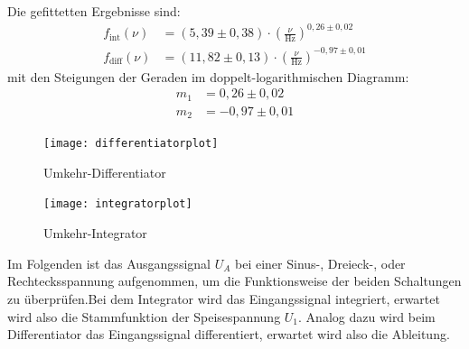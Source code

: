 \documentclass{scrartcl}
\begin{document}
\newpage
\noindent
Die gefittetten Ergebnisse sind:
 \begin{align}
     f_{\text{int}}(\nu)&=(5,39\pm0,38)\cdot \left(\frac{\nu}{\text{Hz}}\right)^{0,26\pm0,02}\\
     f_{\text{diff}}(\nu)&=(11,82\pm0,13)\cdot \left(\frac{\nu}{\text{Hz}}\right)^{-0,97\pm0,01}
 \end{align}
 mit den Steigungen der Geraden im doppelt-logarithmischen Diagramm:
 \begin{align}
   m_1&=0,26\pm0,02\\
   m_2&=-0,97\pm0,01
 \end{align}
\begin{figure}[!h]
\centering
\texttt{[image: differentiatorplot]}
\caption{Umkehr-Differentiator}
\label{dif}
\end{figure}
\begin{figure}[!h]
\centering
\texttt{[image: integratorplot]}
\caption{Umkehr-Integrator}
\label{int}
\end{figure}
\newpage
\noindent
Im Folgenden ist das Ausgangssignal $U_A$ bei einer Sinus-, Dreieck-, oder Rechtecksspannung aufgenommen, um die Funktionsweise der beiden Schaltungen zu überprüfen.Bei dem Integrator wird das Eingangssignal integriert, erwartet wird also die Stammfunktion der Speisespannung $U_1$. Analog dazu wird beim Differentiator das Eingangssignal differentiert, erwartet wird also die Ableitung.
\end{document}

